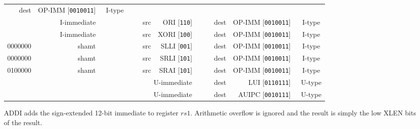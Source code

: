 \documentclass{article}
\begin{document}
\begin{table}[H]
\begin{center}
\begin{tabular}{ccccccccccccccccccccccccccccccccc}
        \multicolumn{5}{|r|}{dest} &
        \multicolumn{7}{|r|}{OP-IMM [\texttt{0010011}]} &
        \ \tiny{I-type}
        \\
        \cline{1-32}
        \multicolumn{12}{|r|}{I-immediate} &
        \multicolumn{5}{|r|}{src} &
        \multicolumn{3}{|r|}{ORI [\texttt{110}]} &
        \multicolumn{5}{|r|}{dest} &
        \multicolumn{7}{|r|}{OP-IMM [\texttt{0010011}]} &
        \ \tiny{I-type}
        \\
        \cline{1-32}
        \multicolumn{12}{|r|}{I-immediate} &
        \multicolumn{5}{|r|}{src} &
        \multicolumn{3}{|r|}{XORI [\texttt{100}]} &
        \multicolumn{5}{|r|}{dest} &
        \multicolumn{7}{|r|}{OP-IMM [\texttt{0010011}]} &
        \ \tiny{I-type}
        \\
        \cline{1-32}
        \multicolumn{7}{|r|}{0000000} &
        \multicolumn{5}{|r|}{shamt} &
        \multicolumn{5}{|r|}{src} &
        \multicolumn{3}{|r|}{SLLI [\texttt{001}]} &
        \multicolumn{5}{|r|}{dest} &
        \multicolumn{7}{|r|}{OP-IMM [\texttt{0010011}]} &
        \ \tiny{I-type}
        \\
        \cline{1-32}
        \multicolumn{7}{|r|}{0000000} &
        \multicolumn{5}{|r|}{shamt} &
        \multicolumn{5}{|r|}{src} &
        \multicolumn{3}{|r|}{SRLI [\texttt{101}]} &
        \multicolumn{5}{|r|}{dest} &
        \multicolumn{7}{|r|}{OP-IMM [\texttt{0010011}]} &
        \ \tiny{I-type}
        \\
        \cline{1-32}
        \multicolumn{7}{|r|}{0100000} &
        \multicolumn{5}{|r|}{shamt} &
        \multicolumn{5}{|r|}{src} &
        \multicolumn{3}{|r|}{SRAI [\texttt{101}]} &
        \multicolumn{5}{|r|}{dest} &
        \multicolumn{7}{|r|}{OP-IMM [\texttt{0010011}]} &
        \ \tiny{I-type}
        \\
        \cline{1-32}
        \multicolumn{20}{|r|}{U-immediate} &
        \multicolumn{5}{|r|}{dest} &
        \multicolumn{7}{|r|}{LUI [\texttt{0110111}]} &
        \ \tiny{U-type}
        \\
        \cline{1-32}
        \multicolumn{20}{|r|}{U-immediate} &
        \multicolumn{5}{|r|}{dest} &
        \multicolumn{7}{|r|}{AUIPC [\texttt{0010111}]} &
        \ \tiny{U-type}
        \\
        \cline{1-32}
    \end{tabular}
    \end{center}
\end{table}

ADDI adds the sign-extended 12-bit immediate to register $rs1$. Arithmetic overflow is ignored and the result is simply the low XLEN bits of the result.
\end{document}
